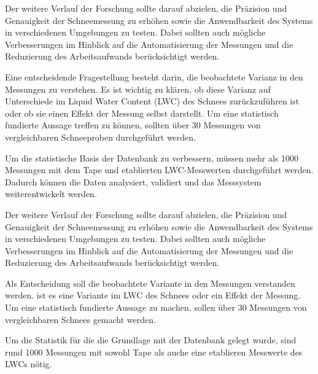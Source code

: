 Der weitere Verlauf der Forschung sollte darauf abzielen, die Präzision und Genauigkeit der Schneemessung zu erhöhen sowie die Anwendbarkeit des Systems in verschiedenen Umgebungen zu testen. Dabei sollten auch mögliche Verbesserungen im Hinblick auf die Automatisierung der Messungen und die Reduzierung des Arbeitsaufwands berücksichtigt werden.

Eine entscheidende Fragestellung besteht darin, die beobachtete Varianz in den Messungen zu verstehen. Es ist wichtig zu klären, ob diese Varianz auf Unterschiede im Liquid Water Content (LWC) des Schnees zurückzuführen ist oder ob sie einen Effekt der Messung selbst darstellt. Um eine statistisch fundierte Aussage treffen zu können, sollten über 30 Messungen von vergleichbaren Schneeproben durchgeführt werden.

Um die statistische Basis der Datenbank zu verbessern, müssen mehr als 1000 Messungen mit dem Tape und etablierten LWC-Messwerten durchgeführt werden. Dadurch können die Daten analysiert, validiert und das Messsystem weiterentwickelt werden.


Der weitere Verlauf der Forschung sollte darauf abzielen, die Präzision und Genauigkeit der Schneemessung zu erhöhen sowie die Anwendbarkeit des Systems in verschiedenen Umgebungen zu testen. Dabei sollten auch mögliche Verbesserungen im Hinblick auf die Automatisierung der Messungen und die Reduzierung des Arbeitsaufwands berücksichtigt werden.

Als Entscheidung soll die beobachtete Variante in den Messungen verstanden werden. ist es eine Variante im LWC des Schnees oder ein Effekt der Messung. Um eine statistisch fundierte Aussage zu machen, sollen über 30 Messungen von vergleichbaren Schnees gemacht werden.

Um die Statistik für die die Grundlage mit der Datenbank gelegt wurde, sind rund 1000 Messungen mit sowohl Tape als auche eine etablieren Messwerte des LWCs nötig.
